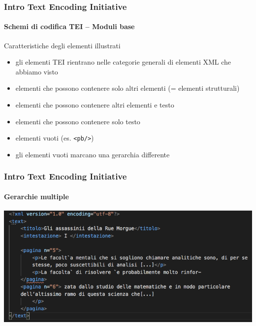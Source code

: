 \begin{frame}
	\frametitle{Intro Text Encoding Initiative}
	\framesubtitle{Schemi di codifica TEI – Moduli base}
	\addtocounter{nframe}{1}

	\begin{block}{Caratteristiche degli elementi illustrati}
        \begin{itemize}
            \item gli elementi TEI rientrano nelle categorie generali di
            elementi XML che abbiamo visto
            \item elementi che possono contenere solo altri elementi (=
            elementi strutturali)
            \item elementi che possono contenere altri elementi e testo
            \item elementi che possono contenere solo testo
            \item  elementi vuoti (es. \texttt{<pb/>})
            \item  gli elementi vuoti marcano una gerarchia differente
        \end{itemize}
    \end{block}
\end{frame}


\begin{frame}
	\frametitle{Intro Text Encoding Initiative}
	\framesubtitle{Gerarchie multiple}
	\addtocounter{nframe}{1}

	\begin{center}
		\includegraphics[width=.95\textwidth]{imgs/overlap.png}
	\end{center}	
	

\end{frame}



